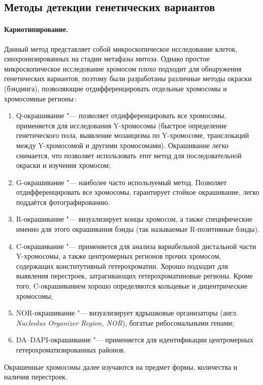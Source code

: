 \documentclass[a4paper,14pt]{extarticle}
\newcommand{\ecitep}[1]{\textenglish{\citep{#1}}}
\newcommand{\engterm}[1]{англ. \textenglish{\textit{#1}}}
\begin{document}
\subsection{Методы детекции генетических вариантов}

\paragraph{Кариотипирование.}
Данный метод представляет собой микроскопическое исследование клеток, синхронизированных на стадии метафазы митоза.
Однако простое микроскопическое исследование хромосом плохо подходит для обнаружения генетических вариантов, поэтому были разработаны различные методы окраски (бэндинга), позволяющие отдифференцировать отдельные хромосомы и хромосомные регионы\,\ecitep{Schreck_2001}:

\begin{enumerate}
	\item Q-окрашивание "--- позволяет отдифференцировать все хромосомы, применяется для исследования Y-хромосомы (быстрое определение генетического пола, выявление мозаицизма по Y-хромосоме, транслокаций между Y-хромосомой и другими хромосомами).
	 Окрашивание легко снимается, что позволяет использовать этот метод для последовательной окраски и изучения хромосом;
	\item G-окрашивание "--- наиболее часто используемый метод.
	 Позволяет отдифференцировать все хромосомы, гарантирует стойкое окрашивание, легко поддаётся фотографированию.
	\item R-окрашивание "--- визуализирует концы хромосом, а также специфические именно для этого окрашивания бэнды (так называемые R\hyp{}позитивные бэнды).
	\item C-окрашивание "--- применяется для анализа вариабельной дистальной части Y-хромосомы, а также центромерных регионов прочих хромосом, содержащих конститутивный гетерохроматин.
	 Хорошо подходит для выявления перестроек, затрагивающих гетерохроматиновые регионы.
	 Кроме того, C-окрашиванием хорошо определяются кольцевые и дицентрические хромосомы;
	\item NOR-окрашивание "--- визуализирует ядрышковые организаторы (\engterm{Nucleolus Organizer Region, NOR}), богатые рибосомальными генами;
	\item DA--DAPI-окрашивание "--- применяется для идентификации центромерных гетерохроматизированных районов.
\end{enumerate}

Окрашенные хромосомы далее изучаются на предмет формы, количества и наличия перестроек.
\end{document}
